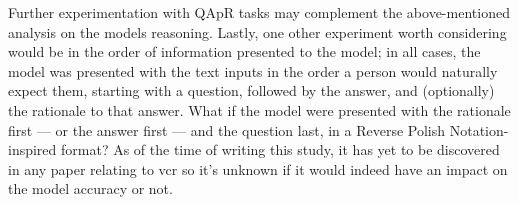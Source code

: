 Further experimentation with QAp\rightarrow{}R tasks may complement the above-mentioned analysis on the models reasoning.
Lastly, one other experiment worth considering would be in the order of information presented to the model; in all cases, the model was presented with the text inputs in the order a person would naturally expect them, starting with a question, followed by the answer, and (optionally) the rationale to that answer.
What if the model were presented with the rationale first --- or the answer first --- and the question last, in a Reverse Polish Notation-inspired format?
As of the time of writing this study, it has yet to be discovered in any paper relating to \gls{vcr} so it's unknown if it would indeed have an impact on the model accuracy or not.
